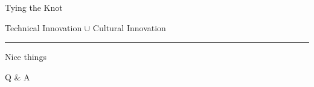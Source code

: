 \documentclass{beamer}
\begin{document}
\begin{frame}{Tying the Knot}

	\begin{centering}

		{\Large Technical Innovation $\cup$ Cultural Innovation}

		\rule{\textwidth}{0.1em}

		{\LARGE Nice things}

	\end{centering}

\end{frame}


\begin{frame}[standout]

	Q \& A

\end{frame}
\end{document}
